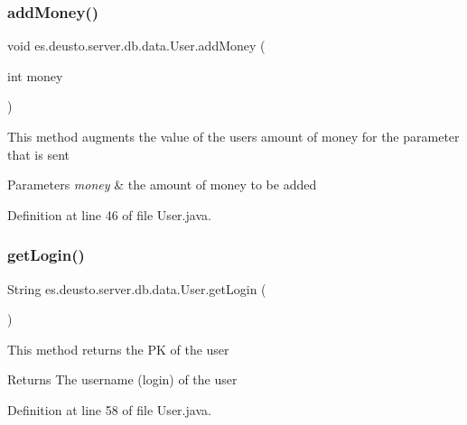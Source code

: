 \subsubsection{\texorpdfstring{add\+Money()}{addMoney()}}
{\footnotesize\ttfamily void es.\+deusto.\+server.\+db.\+data.\+User.\+add\+Money (\begin{DoxyParamCaption}\item[{int}]{money }\end{DoxyParamCaption})}

This method augments the value of the users amount of money for the parameter that is sent 
\begin{DoxyParams}{Parameters}
{\em money} & the amount of money to be added \\
\hline
\end{DoxyParams}


Definition at line 46 of file User.\+java.

\mbox{\label{classes_1_1deusto_1_1server_1_1db_1_1data_1_1_user_a2bc07e76806b027ef70b5ad8cea5f9fa}} 
\subsubsection{\texorpdfstring{get\+Login()}{getLogin()}}
{\footnotesize\ttfamily String es.\+deusto.\+server.\+db.\+data.\+User.\+get\+Login (\begin{DoxyParamCaption}{ }\end{DoxyParamCaption})}

This method returns the PK of the user \begin{DoxyReturn}{Returns}
The username (login) of the user 
\end{DoxyReturn}


Definition at line 58 of file User.\+java.

\mbox{\label{classes_1_1deusto_1_1server_1_1db_1_1data_1_1_user_a685ffb55326ae540eeb26eff13685a76}} 
